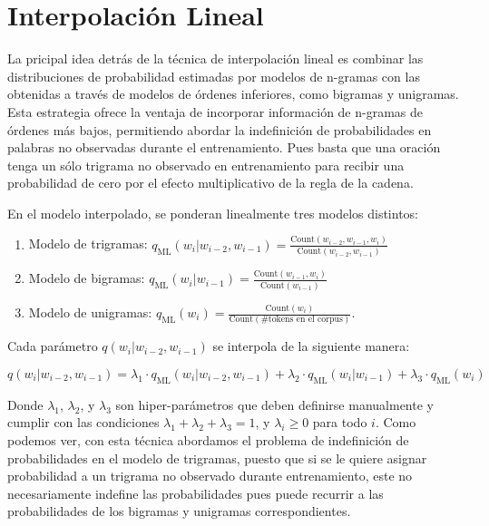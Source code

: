 \documentclass[11pt,fleqn]{book} %
\begin{document}
\pagestyle{empty} %

\tableofcontents %


\pagestyle{fancy} %




\section{Interpolación Lineal}

La pricipal idea detrás de la técnica de interpolación lineal es combinar las distribuciones de probabilidad estimadas por modelos de n-gramas con las obtenidas a través de modelos de órdenes inferiores, como bigramas y unigramas. Esta estrategia ofrece la ventaja de incorporar información de n-gramas de órdenes más bajos, permitiendo abordar la indefinición de probabilidades en palabras no observadas durante el entrenamiento. Pues basta que una oración tenga un sólo trigrama no observado en entrenamiento para recibir una probabilidad de cero por el efecto multiplicativo de la regla de la cadena. 

En el modelo interpolado, se ponderan linealmente tres modelos distintos:

\begin{enumerate}
    \item Modelo de trigramas: $q_{\text{ML}}(w_i | w_{i-2}, w_{i-1}) = \frac{{\text{Count}(w_{i-2}, w_{i-1}, w_i)}}{{\text{Count}(w_{i-2}, w_{i-1})}}$ 
    \item Modelo de bigramas: $q_{\text{ML}}(w_i | w_{i-1}) = \frac{{\text{Count}(w_{i-1}, w_i)}}{{\text{Count}(w_{i-1})}}$ 
    \item Modelo de unigramas: $q_{\text{ML}}(w_i) = \frac{{\text{Count}(w_i)}}{{\text{Count}(\# \text{tokens en el corpus})}}$. 
\end{enumerate}

Cada parámetro $q(w_i | w_{i-2}, w_{i-1})$ se interpola de la siguiente manera:

\[
q(w_i | w_{i-2}, w_{i-1}) = \lambda_1 \cdot q_{\text{ML}}(w_i | w_{i-2}, w_{i-1}) + \lambda_2 \cdot q_{\text{ML}}(w_i | w_{i-1}) + \lambda_3 \cdot q_{\text{ML}}(w_i)
\]

Donde $\lambda_1$, $\lambda_2$, y $\lambda_3$ son hiper-parámetros que deben definirse manualmente y cumplir con las condiciones $\lambda_1 + \lambda_2 + \lambda_3 = 1$, y $\lambda_i \geq 0$ para todo $i$. Como podemos ver, con esta técnica abordamos el problema de indefinición de probabilidades en el modelo de trigramas, puesto que si se le quiere asignar probabilidad a un trigrama no observado durante entrenamiento, este no necesariamente indefine las probabilidades pues puede recurrir a las probabilidades de los bigramas y unigramas correspondientes. 
\end{document}
